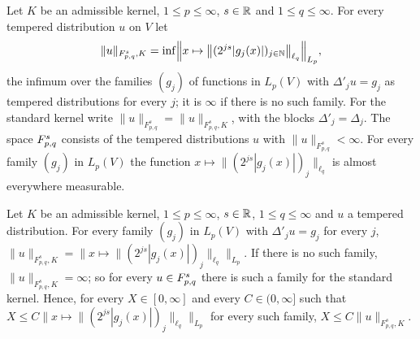 \begin{definition}
\label{def:tl-distr}
\leanok
{}
Let $K$ be an admissible kernel, $1 \leq p \leq \infty$, $s \in \mathbb{R}$ and $1 \leq q \leq \infty$.
For every tempered distribution $u$ on $V$ let
\[
  \|u\|_{F^s_{p,q}, K} = \inf \Bigl\| x \mapsto \bigl\| (2^{js} |g_j(x)|)_{j \in \mathbb{N}}
  \bigr\|_{\ell_q} \Bigr\|_{L_p} ,
\]
the infimum over the families $(g_j)$ of functions in $L_p(V)$ with $\Delta'_j u = g_j$ as
tempered distributions for every $j$; it is $\infty$ if there is no such family. For the
standard kernel write $\|u\|_{F^s_{p,q}} = \|u\|_{F^s_{p,q}, K}$, with the blocks
$\Delta'_j = \Delta_j$. The space $F^{s}_{p,q}$ consists of the tempered distributions $u$ with
$\|u\|_{F^s_{p,q}} < \infty$. For every family $(g_j)$ in $L_p(V)$ the function
$x \mapsto \| (2^{js} |g_j(x)|)_j \|_{\ell_q}$ is almost everywhere measurable.
\end{definition}

\begin{lemma}
\label{lem:tl-distr-eq}
\leanok
{}
Let $K$ be an admissible kernel, $1 \leq p \leq \infty$, $s \in \mathbb{R}$, $1 \leq q \leq \infty$ and
$u$ a tempered distribution. For every family $(g_j)$ in $L_p(V)$ with $\Delta'_j u = g_j$ for
every $j$, $\|u\|_{F^s_{p,q}, K} = \| x \mapsto \| (2^{js} |g_j(x)|)_j \|_{\ell_q} \|_{L_p}$. If
there is no such family, $\|u\|_{F^s_{p,q}, K} = \infty$; so for every $u \in F^{s}_{p,q}$ there
is such a family for the standard kernel. Hence, for every $X \in [0, \infty]$ and every
$C \in (0, \infty]$ such that $X \leq C \| x \mapsto \| (2^{js} |g_j(x)|)_j \|_{\ell_q} \|_{L_p}$
for every such family, $X \leq C \|u\|_{F^s_{p,q}, K}$.
\end{lemma}

